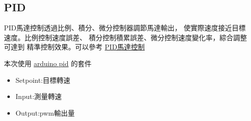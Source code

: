 \subsection{PID}
PID馬達控制透過比例、積分、微分控制器調節馬達輸出，
使實際速度接近目標速度。比例控制速度誤差、
積分控制積累誤差、微分控制速度變化率，綜合調整可達到
精準控制效果。可以參考
\href{https://geekeeceebee.com/index.html}{PID馬達控制}

本次使用
\href{https://github.com/br3ttb/Arduino-PID-Library/tree/master}{arduino pid}
的套件

\begin{itemize}
    \item Setpoint:目標轉速
    \item Input:測量轉速
    \item Output:pwm輸出量
\end{itemize}
